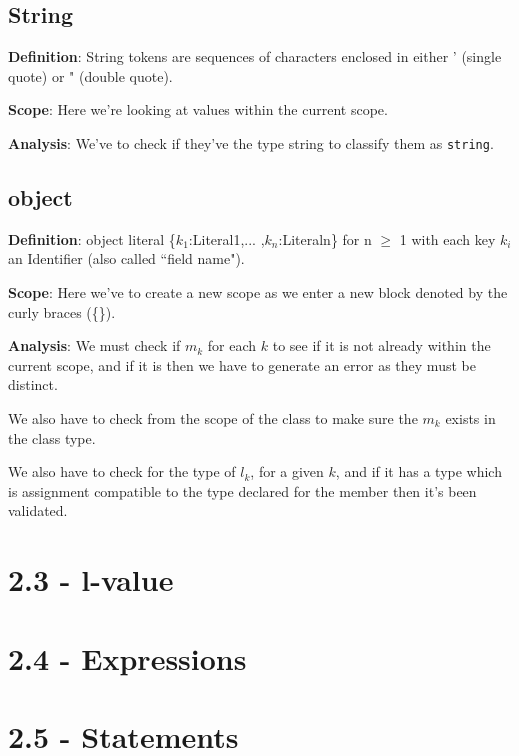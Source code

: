 \documentclass[11pt, oneside]{article}
\begin{document}
\subsection*{String}
\par \textbf{Definition}: String tokens are sequences of characters enclosed in either ' (single quote) or " (double quote).
\par \textbf{Scope}: Here we're looking at values within the current scope.
\par \textbf{Analysis}: We've to check if they've the type string to classify them as  \texttt{string}.

\subsection*{object}
\par \textbf{Definition}: object literal \{$k_1$:Literal1,... ,$k_n$:Literaln\} for n $\geq$ 1 with each key $k_i$ an Identifier (also called ``field name").
\par \textbf{Scope}: Here we've to create a new scope as we enter a new block denoted by the curly braces (\{\}).
\par \textbf{Analysis}: We must check if $m_k$ for each $k$ to see if it is not already within the current scope, and if it is then we have to generate an error as they must be distinct.
\par We also have to check from the scope of the class to make sure the $m_k$ exists in the class type.
\par We also have to check for the type of $l_k$, for a given $k$, and if it has a type which is assignment compatible to the type declared for the member then it's been validated.

\section*{2.3 - l-value}
\par 

\section*{2.4 - Expressions}
\par

\section*{2.5 - Statements}
\par
\end{document}
